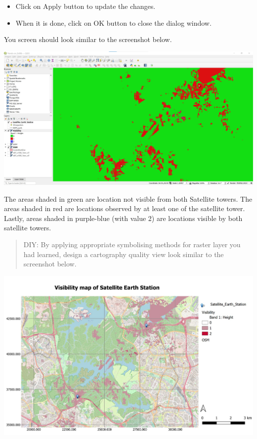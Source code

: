 \documentclass[
  letterpaper,
  DIV=11,
  numbers=noendperiod]{scrreprt}
\begin{document}
\begin{itemize}
\item
  Click on Apply button to update the changes.
\item
  When it is done, click on OK button to close the dialog window.
\end{itemize}

You screen should look similar to the screenshot below.

\includegraphics{./img06/image84.jpg}

The areas shaded in green are location not visible from both Satellite
towers. The areas shaded in red are locations observed by at least one
of the satellite tower. Lastly, areas shaded in purple-blue (with value
2) are locations visible by both satellite towers.

\begin{quote}
DIY: By applying appropriate symbolising methods for raster layer you
had learned, design a cartography quality view look similar to the
screenshot below.
\end{quote}

\includegraphics{./img06/image85.jpg}
\end{document}
